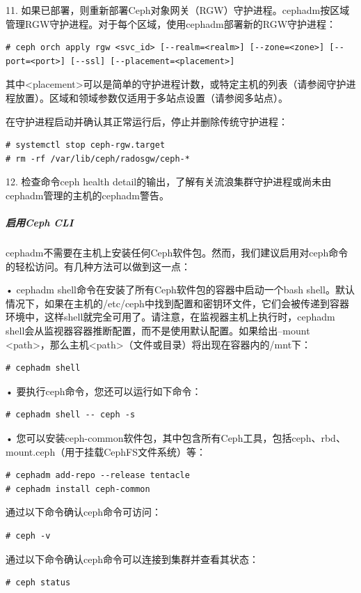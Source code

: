 \documentclass[12pt,UTF8]{ctexbook}
\begin{document}
11. 如果已部署，则重新部署Ceph对象网关（RGW）守护进程。cephadm按区域管理RGW守护进程。对于每个区域，使用cephadm部署新的RGW守护进程：
\begin{verbatim}
# ceph orch apply rgw <svc_id> [--realm=<realm>] [--zone=<zone>] [--port=<port>] [--ssl] [--placement=<placement>]
\end{verbatim}

其中<placement>可以是简单的守护进程计数，或特定主机的列表（请参阅守护进程放置）。区域和领域参数仅适用于多站点设置（请参阅多站点）。

在守护进程启动并确认其正常运行后，停止并删除传统守护进程：
\begin{verbatim}
# systemctl stop ceph-rgw.target
# rm -rf /var/lib/ceph/radosgw/ceph-*
\end{verbatim}

12. 检查命令ceph health detail的输出，了解有关流浪集群守护进程或尚未由cephadm管理的主机的cephadm警告。

\subparagraph{启用Ceph CLI}

cephadm不需要在主机上安装任何Ceph软件包。然而，我们建议启用对ceph命令的轻松访问。有几种方法可以做到这一点：

• cephadm shell命令在安装了所有Ceph软件包的容器中启动一个bash shell。默认情况下，如果在主机的/etc/ceph中找到配置和密钥环文件，它们会被传递到容器环境中，这样shell就完全可用了。请注意，在监视器主机上执行时，cephadm shell会从监视器容器推断配置，而不是使用默认配置。如果给出--mount <path>，那么主机<path>（文件或目录）将出现在容器内的/mnt下：
\begin{verbatim}
# cephadm shell
\end{verbatim}

• 要执行ceph命令，您还可以运行如下命令：
\begin{verbatim}
# cephadm shell -- ceph -s
\end{verbatim}

• 您可以安装ceph-common软件包，其中包含所有Ceph工具，包括ceph、rbd、mount.ceph（用于挂载CephFS文件系统）等：
\begin{verbatim}
# cephadm add-repo --release tentacle
# cephadm install ceph-common
\end{verbatim}

通过以下命令确认ceph命令可访问：
\begin{verbatim}
# ceph -v
\end{verbatim}

通过以下命令确认ceph命令可以连接到集群并查看其状态：
\begin{verbatim}
# ceph status
\end{verbatim}
\end{document}

